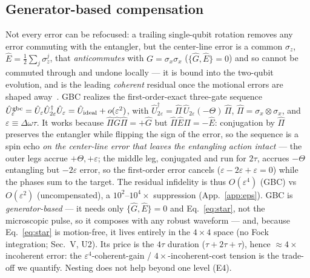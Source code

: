 \documentclass[aps,prapplied,twocolumn,superscriptaddress,floatfix,nofootinbib]{revtex4-2}
\begin{document}
\subsection{Generator-based compensation}
Not every error can be refocused: a trailing single-qubit rotation removes any error commuting
with the entangler, but the center-line error is a common $\sigma_z$, $\hat E=\tfrac12\sum_j\sigma_z^j$,
that \emph{anticommutes} with $G=\sigma_x\sigma_x$ ($\{\hat G,\hat E\}=0$) and so cannot be commuted
through and undone locally --- it is bound into the two-qubit evolution, and is the leading
\emph{coherent} residual once the motional errors are shaped away~\cite{Pogorelov21,Postler22}.
GBC realizes the first-order-exact three-gate sequence
$\hat U^{\rm gbc}_\varepsilon=\hat U_\varepsilon\hat U^\dagger_{2\varepsilon}\hat U_\varepsilon
=\hat U_{\rm ideal}+o(\varepsilon^2)$, with $\hat U^\dagger_{2\varepsilon}=\hat\Pi\,\hat
U_{2\varepsilon}(-\Theta)\,\hat\Pi$, $\hat\Pi=\sigma_x\!\otimes\!\sigma_x$, and
$\varepsilon\equiv\Delta\omega\tau$. It works because $\hat\Pi\hat G\hat\Pi=+\hat G$ but
$\hat\Pi\hat E\hat\Pi=-\hat E$: conjugation by $\hat\Pi$ preserves the entangler while flipping
the sign of the error, so the sequence is a spin echo \emph{on the center-line error that leaves
the entangling action intact} --- the outer legs accrue $+\Theta,+\varepsilon$; the middle leg,
conjugated and run for $2\tau$, accrues $-\Theta$ entangling but $-2\varepsilon$ error, so the
first-order error cancels ($\varepsilon-2\varepsilon+\varepsilon=0$) while the phases sum to the
target. The residual infidelity is thus $O(\varepsilon^4)$ (GBC) vs $O(\varepsilon^2)$
(uncompensated), a $10^2$--$10^4\times$ suppression (App.~\ref{app:eps}). GBC is
\emph{generator-based} --- it needs only $\{\hat G,\hat E\}=0$ and Eq.~\eqref{eq:star}, not the
microscopic pulse, so it composes with any robust waveform --- and, because Eq.~\eqref{eq:star}
is motion-free, it lives entirely in the $4\times4$ space (no Fock integration; Sec.~V, U2). Its
price is the $4\tau$ duration ($\tau+2\tau+\tau$), hence $\approx4\times$ incoherent error: the
$\varepsilon^4$-coherent-gain / $4\times$-incoherent-cost tension is the trade-off we quantify.
Nesting does not help beyond one level (E4).
\end{document}
